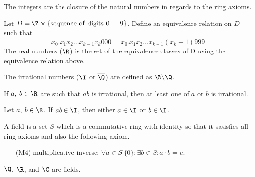 \documentclass{article}
\begin{document}
\begin{note}
    The integers are the closure of the natural numbers in regards to the ring axioms.
\end{note}
%
\begin{definition}
    Let \(D = \Z \times \{\mathrm{sequence\ of\ digits\ 0\dots 9}\}\).
    Define an equivalence relation on \(D\) such that
    \begin{equation*}
        x_0 . x_1 x_2 \dots x_{k-1} x_k \overline{000} = x_0 . x_1 x_2 \dots x_{k-1} \left(x_k - 1\right)\overline{999}
    \end{equation*}
    The real numbers (\(\R\)) is the set of the equivalence classes of D using the equivalence relation above.
\end{definition}
%
\begin{definition}
    The irrational numbers (\(\I\) or \(\overline{\Q}\)) are defined as \(\R\backslash\Q\).
\end{definition}
\begin{theorem}
    If \(a,\:b\in\R\) are such that \(ab\) is irrational, then at least one of \(a\) or \(b\) is irrational.
\end{theorem}
%
\begin{note}
    Let \(a,\: b\in \R\). If \(ab\in\I\), then either \(a\in\I\) or \(b\in\I\).
\end{note}
%
\begin{tcolorboxlarge}[title={Field Axioms}]
    \begin{definition}[Field]
        A field is a set \(S\) which is a commutative ring with identity so that it satisfies all ring axioms and also the following axiom.
    \end{definition}
    \begin{enumerate}
        \item[(M4)] multiplicative inverse: \(\forall a \in S \ \{0\}:\exists b \in S: a\cdot b=e\).
    \end{enumerate}
\end{tcolorboxlarge}
\begin{note}
    \(\Q\), \(\R\), and \(\C\) are fields.
\end{note}
%
\end{document}
